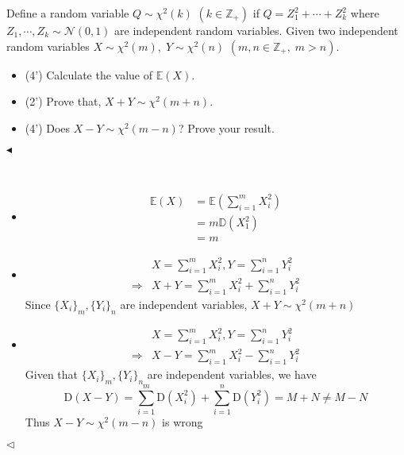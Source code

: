 \documentclass[11pt]{article}
\newenvironment{problem}[2][Problem]{\begin{trivlist}
\item[\hskip \labelsep {\bfseries #1}\hskip \labelsep {\bfseries #2.}]}{\hfill$\blacktriangleleft$\end{trivlist}}
\newenvironment{answer}[1][Answer]{\begin{trivlist}
\item[\hskip \labelsep {\bfseries #1.}\hskip \labelsep]}{\hfill$\lhd$\end{trivlist}}
\begin{document}
\begin{problem}{2 (10')}
Define a random variable $Q \sim \chi^2(k)$ $(k\in\mathbb{Z}_+)$ if $Q=Z_1^2+\cdots+Z_k^2$ where $Z_1,\cdots,Z_k \sim \mathcal{N}(0,1)$ are independent random variables. Given two independent random variables $X\sim\chi^2(m),\;Y\sim\chi^2(n)$ $(m,n\in\mathbb{Z}_+,\;m > n)$.
\begin{itemize}
    \item [(1)] (4') Calculate the value of $\mathbb{E}(X)$.
    \item [(2)] (2') Prove that, $X + Y \sim \chi^2(m + n)$.
    \item [(3)] (4') Does $X - Y \sim \chi^2(m - n)$? Prove your result.
\end{itemize}
\end{problem}

\begin{answer} ~
\begin{itemize}
    \item [(1)]
$$\begin{align*}
\mathbb{E}(X) &=\mathbb{E}\left(\sum_{i=1}^m X_i^2 \right)\\
&=m \mathbb D(X_1^2)\\
&=m
\end{align*}$$
    \item [(2)]
$$\begin{align*}&X=\sum_{i=1}^m X_i^2,Y=\sum_{i=1}^n Y_i^2\\
\Rightarrow& X+Y=\sum_{i=1}^m X_i^2+\sum_{i=1}^n Y_i^2\end{align*}$$
Since $\{X_i\}_m,\{Y_i\}_n$ are independent variables, $X+Y \sim \chi^2(m+n)$
    \item [(3)] 
$$\begin{align*}&X=\sum_{i=1}^m X_i^2,Y=\sum_{i=1}^n Y_i^2\\
\Rightarrow& X-Y=\sum_{i=1}^m X_i^2-\sum_{i=1}^n Y_i^2\end{align*}$$
Given that $\{X_i\}_m,\{Y_i\}_n$ are independent variables, we have
$$\mathrm{D}(X-Y)=\sum_{i=1}^m \mathrm D(X_i^2)+\sum_{i=1}^n \mathrm D(Y_i^2)=M+N\neq M-N$$
Thus $X-Y \sim \chi^2(m-n)$ is wrong
\end{itemize}
\end{answer}
\end{document}
